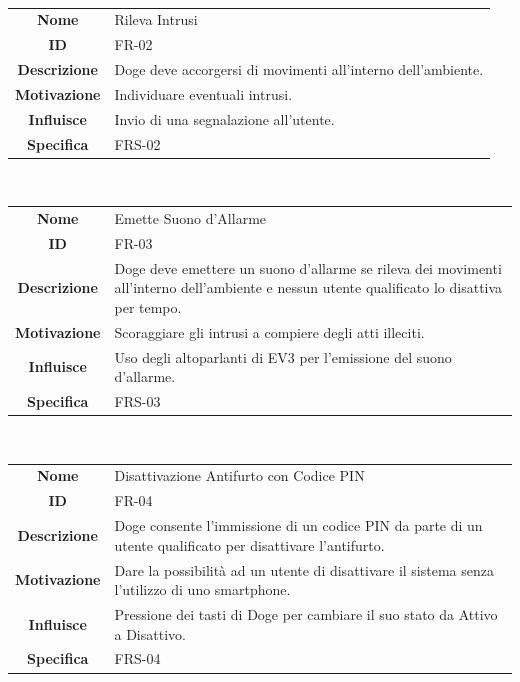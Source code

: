 \documentclass{article}
\begin{document}
~

\begin{adjustbox}{center}
\begin{tabular}{|c|p{10cm}|}
\hline
\textbf{Nome} & Rileva Intrusi \\
\textbf{ID} & FR-02 \\
\textbf{Descrizione} & Doge deve accorgersi di movimenti all'interno dell'ambiente. \\
\textbf{Motivazione} & Individuare eventuali intrusi. \\
\textbf{Influisce} & Invio di una segnalazione all'utente. \\
\textbf{Specifica} & FRS-02 \\
\hline
\end{tabular}
\end{adjustbox}

~

\begin{adjustbox}{center}
\begin{tabular}{|c|p{10cm}|}
\hline
\textbf{Nome} & Emette Suono d'Allarme \\
\textbf{ID} & FR-03 \\
\textbf{Descrizione} & Doge deve emettere un suono d'allarme se rileva dei movimenti all'interno dell'ambiente e nessun utente qualificato lo disattiva per tempo. \\
\textbf{Motivazione} & Scoraggiare gli intrusi a compiere degli atti illeciti. \\
\textbf{Influisce} & Uso degli altoparlanti di EV3 per l'emissione del suono d'allarme. \\
\textbf{Specifica} & FRS-03 \\
\hline
\end{tabular}
\end{adjustbox}

~

\begin{adjustbox}{center}
\begin{tabular}{|c|p{10cm}|}
\hline
\textbf{Nome} & Disattivazione Antifurto con Codice PIN \\
\textbf{ID} & FR-04 \\
\textbf{Descrizione} & Doge consente l'immissione di un codice PIN da parte di un utente qualificato per disattivare l'antifurto. \\
\textbf{Motivazione} & Dare la possibilità ad un utente di disattivare il sistema senza l'utilizzo di uno smartphone. \\
\textbf{Influisce} & Pressione dei tasti di Doge per cambiare il suo stato da Attivo a Disattivo. \\
\textbf{Specifica} & FRS-04 \\
\hline
\end{tabular}
\end{adjustbox}
\end{document}
